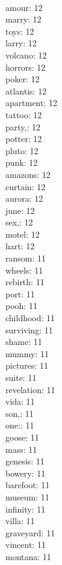 \begin{multicols}{6}
  \\ amour: 12
  \\ marry: 12
  \\ toys: 12
  \\ larry: 12
  \\ volcano: 12
  \\ horrors: 12
  \\ poker: 12
  \\ atlantis: 12
  \\ apartment: 12
  \\ tattoo: 12
  \\ party,: 12
  \\ potter: 12
  \\ pluto: 12
  \\ punk: 12
  \\ amazons: 12
  \\ curtain: 12
  \\ aurora: 12
  \\ june: 12
  \\ sex,: 12
  \\ motel: 12
  \\ hart: 12
  \\ ransom: 11
  \\ wheels: 11
  \\ rebirth: 11
  \\ port: 11
  \\ pooh: 11
  \\ childhood: 11
  \\ surviving: 11
  \\ shame: 11
  \\ mummy: 11
  \\ pictures: 11
  \\ suite: 11
  \\ revelation: 11
  \\ vida: 11
  \\ son,: 11
  \\ one:: 11
  \\ goose: 11
  \\ mass: 11
  \\ genesis: 11
  \\ bowery: 11
  \\ barefoot: 11
  \\ museum: 11
  \\ infinity: 11
  \\ villa: 11
  \\ graveyard: 11
  \\ vincent: 11
  \\ montana: 11

\end{multicols}
